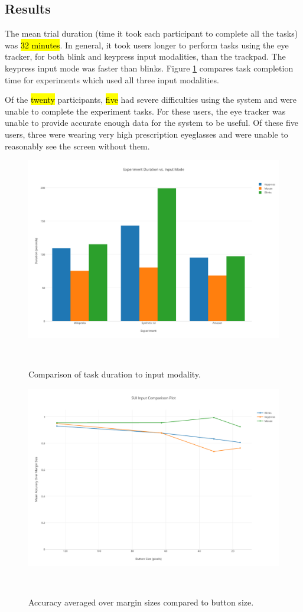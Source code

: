 \documentclass{sigchi}
\begin{document}
\subsection{Results}
The mean trial duration (time it took each participant to complete all the tasks) was \hl{32 minutes}. In general, it took users longer to perform tasks using the eye tracker, for both blink and keypress input modalities, than the trackpad. The keypress input mode was faster than blinks. Figure \ref{fig:task-durations} compares task completion time for experiments which used all three input modalities.

Of the \hl{twenty} participants, \hl{five} had severe difficulties using the system and were unable to complete the experiment tasks. For these users, the eye tracker was unable to provide accurate enough data for the system to be useful. Of these five users, three were wearing very high prescription eyeglasses and were unable to reasonably see the screen without them.

\begin{figure}
\centering
  \includegraphics[width=0.9\columnwidth]{figures/task-durations.pdf}
  \caption{Comparison of task duration to input modality.
  }~\label{fig:task-durations}
\end{figure}

\begin{figure}
\centering
  \includegraphics[width=0.9\columnwidth]{figures/mean-accuracy.pdf}
  \caption{Accuracy averaged over margin sizes compared to button size.
  }~\label{fig:mean-accuracy}
\end{figure}
\end{document}
